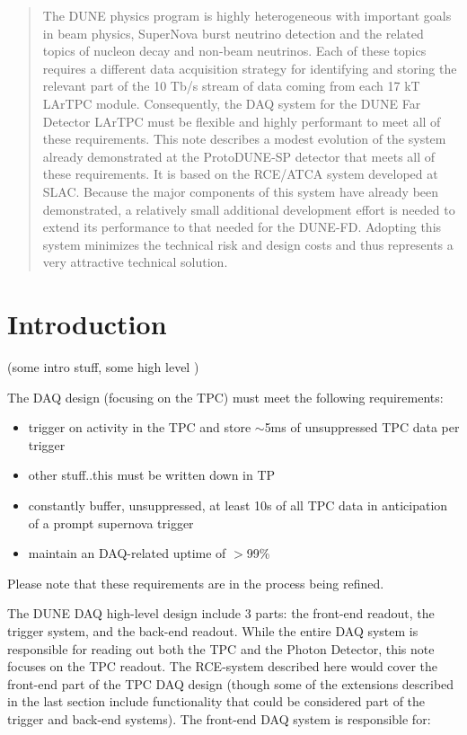 \begin{abstract}
The DUNE physics program is highly heterogeneous with important goals in beam physics, SuperNova burst neutrino detection and the related topics of nucleon decay and non-beam neutrinos.
Each of these topics requires a different data acquisition strategy for identifying and storing the relevant part of the 10 Tb/s stream of data coming from each 17 kT LArTPC module. 
Consequently, the DAQ system for the DUNE Far Detector LArTPC must be flexible and highly performant to meet all of these requirements.
This note describes a modest evolution of the system already demonstrated at the ProtoDUNE-SP detector that meets all of these requirements. 
It is based on the RCE/ATCA system developed at SLAC. 
Because the major components of this system have already been demonstrated, a relatively small additional development effort is needed to extend its performance to that needed for the DUNE-FD. 
Adopting this system minimizes the technical risk and design costs and thus represents a very attractive technical solution.

\end{abstract}

\section{Introduction}
\label{sec:introduction}
(some intro stuff, some high level )

The DAQ design (focusing on the TPC) must meet the following requirements:
\begin{itemize}
\item{trigger on activity in the TPC and store $\sim$5ms of unsuppressed TPC data per trigger}
\item{other stuff..this must be written down in TP}
\item{constantly buffer, unsuppressed, at least 10s of all TPC data in anticipation of a prompt supernova trigger}
\item{maintain an DAQ-related uptime of $>$99\%}
\end{itemize}
Please note that these requirements are in the process being refined.  

The DUNE DAQ high-level design include 3 parts:  the front-end readout, the trigger system, and the back-end readout.  While the entire DAQ system is responsible for reading out both the TPC and the Photon Detector, this note focuses on the TPC readout.  The RCE-system described here would cover the front-end part of the TPC DAQ design (though some of the extensions described in the last section include functionality that could be considered part of the trigger and back-end systems).   The front-end DAQ system is responsible for:

